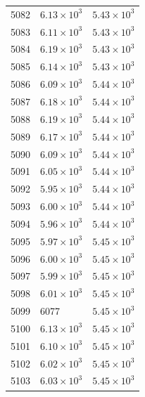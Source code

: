 \begin{table}[H]
\begin{tabular}{lll}
5082 & $\displaystyle 6.13 \times 10^{3}$ & $\displaystyle 5.43 \times 10^{3}$ \\
5083 & $\displaystyle 6.11 \times 10^{3}$ & $\displaystyle 5.43 \times 10^{3}$ \\
5084 & $\displaystyle 6.19 \times 10^{3}$ & $\displaystyle 5.43 \times 10^{3}$ \\
5085 & $\displaystyle 6.14 \times 10^{3}$ & $\displaystyle 5.43 \times 10^{3}$ \\
5086 & $\displaystyle 6.09 \times 10^{3}$ & $\displaystyle 5.44 \times 10^{3}$ \\
5087 & $\displaystyle 6.18 \times 10^{3}$ & $\displaystyle 5.44 \times 10^{3}$ \\
5088 & $\displaystyle 6.19 \times 10^{3}$ & $\displaystyle 5.44 \times 10^{3}$ \\
5089 & $\displaystyle 6.17 \times 10^{3}$ & $\displaystyle 5.44 \times 10^{3}$ \\
5090 & $\displaystyle 6.09 \times 10^{3}$ & $\displaystyle 5.44 \times 10^{3}$ \\
5091 & $\displaystyle 6.05 \times 10^{3}$ & $\displaystyle 5.44 \times 10^{3}$ \\
5092 & $\displaystyle 5.95 \times 10^{3}$ & $\displaystyle 5.44 \times 10^{3}$ \\
5093 & $\displaystyle 6.00 \times 10^{3}$ & $\displaystyle 5.44 \times 10^{3}$ \\
5094 & $\displaystyle 5.96 \times 10^{3}$ & $\displaystyle 5.44 \times 10^{3}$ \\
5095 & $\displaystyle 5.97 \times 10^{3}$ & $\displaystyle 5.45 \times 10^{3}$ \\
5096 & $\displaystyle 6.00 \times 10^{3}$ & $\displaystyle 5.45 \times 10^{3}$ \\
5097 & $\displaystyle 5.99 \times 10^{3}$ & $\displaystyle 5.45 \times 10^{3}$ \\
5098 & $\displaystyle 6.01 \times 10^{3}$ & $\displaystyle 5.45 \times 10^{3}$ \\
5099 & 6077 & $\displaystyle 5.45 \times 10^{3}$ \\
5100 & $\displaystyle 6.13 \times 10^{3}$ & $\displaystyle 5.45 \times 10^{3}$ \\
5101 & $\displaystyle 6.10 \times 10^{3}$ & $\displaystyle 5.45 \times 10^{3}$ \\
5102 & $\displaystyle 6.02 \times 10^{3}$ & $\displaystyle 5.45 \times 10^{3}$ \\
5103 & $\displaystyle 6.03 \times 10^{3}$ & $\displaystyle 5.45 \times 10^{3}$ \\

\end{tabular}
\end{table}
